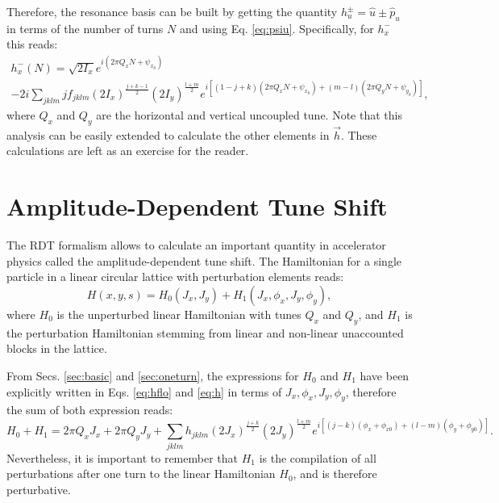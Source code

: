 Therefore, the resonance basis can be built by getting the quantity $h_u^{\pm}=\hat{u}\pm \hat{p}_u$ in terms of the number of turns $N$ and using Eq. \ref{eq:psiu}. Specifically, for $h_x^{-}$ this reads:
\begin{multline}
    \label{eq:hx-}
    h_x^{-}(N)=\sqrt{2I_x}e^{i\left( 2\pi Q_x N +\psi_{x_0}\right)} \\
    -2i \sum_{jklm} j f_{jklm} \left( 2I_x \right)^{\frac{j+k-1}{2}}\left( 2I_y \right)^{\frac{l+m}{2}}
    e^{i \left[ \left( 1-j+k\right)\left( 2\pi Q_x N + \psi_{x_0} \right) +\left( m-l\right)\left( 2\pi Q_y N + \psi_{y_0} \right)\right]},
\end{multline}
where $Q_x$ and $Q_y$ are the horizontal and vertical uncoupled tune. Note that this analysis can be easily extended to calculate the other elements in $\vec{h}$. These calculations are left as an exercise for the reader.  

\section{\label{sec:amp}Amplitude-Dependent Tune Shift}
The RDT formalism allows to calculate an important quantity in accelerator physics called the amplitude-dependent tune shift. The Hamiltonian for a single particle in a linear circular lattice with perturbation elements reads: 
\begin{equation}
    \label{eq:hh}
    H(x,y,s)=H_{0}(J_x,J_y)+H_{1}(J_x, \phi_x, J_y, \phi_y), 
\end{equation} 
where $H_0$ is the unperturbed linear Hamiltonian with tunes $Q_x$ and $Q_y$, and $H_1$ is the perturbation Hamiltonian stemming from linear and non-linear unaccounted blocks in the lattice.

From Secs. \ref{sec:basic} and \ref{sec:oneturn}, the expressions for $H_0$ and $H_1$ have been explicitly written in Eqs. \ref{eq:hflo} and \ref{eq:h} in terms of $J_x,\phi_x,J_y,\phi_y$, therefore the sum of both expression reads:
\begin{equation}
    \label{eq:h0h1}
    H_0+H_1=2\pi Q_x J_x + 2\pi Q_y J_y + \sum_{jklm} h_{jklm} \left( 2 J_x\right)^{\frac{j+k}{2}} \left( 2 J_y\right)^{\frac{l+m}{2}} e^{i\left[ \left( j-k \right)\left( \phi_x+\phi_{x0} \right)+ \left( l-m \right) \left( \phi_y+\phi_{y0} \right)\right]}.
\end{equation}
Nevertheless, it is important to remember that $H_1$ is the compilation of all perturbations after one turn to the linear Hamiltonian $H_0$, and is therefore perturbative. 

